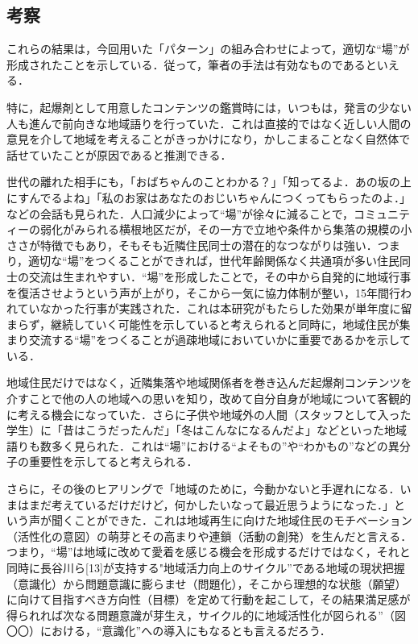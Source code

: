 \documentclass[a4paper]{jsarticle}
\begin{document}
\subsection{考察}
これらの結果は，今回用いた「パターン」の組み合わせによって，適切な“場”が形成されたことを示している．従って，筆者の手法は有効なものであるといえる．\par
特に，起爆剤として用意したコンテンツの鑑賞時には，いつもは，発言の少ない人も進んで前向きな地域語りを行っていた．これは直接的ではなく近しい人間の意見を介して地域を考えることがきっかけになり，かしこまることなく自然体で話せていたことが原因であると推測できる．
\par
世代の離れた相手にも，「おばちゃんのことわかる？」「知ってるよ．あの坂の上にすんでるよね」「私のお家はあなたのおじいちゃんにつくってもらったのよ．」などの会話も見られた．人口減少によって“場”が徐々に減ることで，コミュニティーの弱化がみられる横根地区だが，その一方で立地や条件から集落の規模の小ささが特徴でもあり，そもそも近隣住民同士の潜在的なつながりは強い．つまり，適切な“場”をつくることができれば，世代年齢関係なく共通項が多い住民同士の交流は生まれやすい．“場”を形成したことで，その中から自発的に地域行事を復活させようという声が上がり，そこから一気に協力体制が整い，15年間行われていなかった行事が実践された．これは本研究がもたらした効果が単年度に留まらず，継続していく可能性を示していると考えられると同時に，地域住民が集まり交流する“場”をつくることが過疎地域においていかに重要であるかを示している．\par
地域住民だけではなく，近隣集落や地域関係者を巻き込んだ起爆剤コンテンツを介すことで他の人の地域への思いを知り，改めて自分自身が地域について客観的に考える機会になっていた．さらに子供や地域外の人間（スタッフとして入った学生）に「昔はこうだったんだ」「冬はこんなになるんだよ」などといった地域語りも数多く見られた．これは“場”における“よそもの”や“わかもの”などの異分子の重要性を示してると考えられる．\par
さらに，その後のヒアリングで「地域のために，今動かないと手遅れになる．いまはまだ考えているだけだけど，何かしたいなって最近思うようになった．」という声が聞くことができた．これは地域再生に向けた地域住民のモチベーション（活性化の意図）の萌芽とその高まりや連鎖（活動の創発）を生んだと言える．つまり，“場”は地域に改めて愛着を感じる機会を形成するだけではなく，それと同時に長谷川ら[13]が支持する"地域活力向上のサイクル”である地域の現状把握（意識化）から問題意識に膨らませ（問題化），そこから理想的な状態（願望）に向けて目指すべき方向性（目標）を定めて行動を起こして，その結果満足感が得られれば次なる問題意識が芽生え，サイクル的に地域活性化が図られる”（図〇〇）における，“意識化”への導入にもなるとも言えるだろう．
\end{document}
